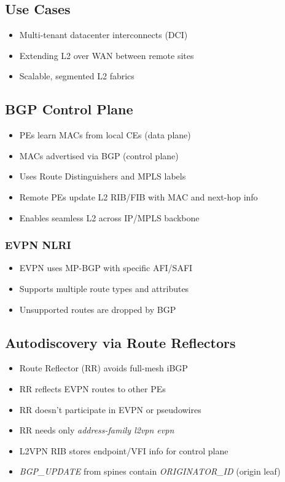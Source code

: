 \begin{multicols*}{5}
		\subsection{Use Cases}
		\begin{itemize}
			\item Multi-tenant datacenter interconnects (DCI)
			\item Extending L2 over WAN between remote sites
			\item Scalable, segmented L2 fabrics
		\end{itemize}
		
		\subsection{BGP Control Plane}
		\begin{itemize}
			\item PEs learn MACs from local CEs (data plane)
			\item MACs advertised via BGP (control plane)
			\item Uses Route Distinguishers and MPLS labels
			\item Remote PEs update L2 RIB/FIB with MAC and next-hop info
			\item Enables seamless L2 across IP/MPLS backbone
		\end{itemize}
		
		\subsubsection{EVPN NLRI}
		\begin{itemize}
			\item EVPN uses MP-BGP with specific AFI/SAFI
			\item Supports multiple route types and attributes
			\item Unsupported routes are dropped by BGP
		\end{itemize}
		
		\subsection{Autodiscovery via Route Reflectors}
		\begin{itemize}
			\item Route Reflector (RR) avoids full-mesh iBGP
			\item RR reflects EVPN routes to other PEs
			\item RR doesn't participate in EVPN or pseudowires
			\item RR needs only \textit{address-family l2vpn evpn}
			\item L2VPN RIB stores endpoint/VFI info for control plane
			\item \textit{BGP\_UPDATE} from spines contain \textit{ORIGINATOR\_ID} (origin leaf)
		\end{itemize}
		

\end{multicols*}

